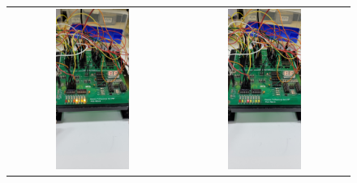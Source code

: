 \documentclass[a4,12pt]{horizon-theme}
\begin{document}
\begin{figure}[!ht]
  \centering
  \begin{tabular}{cc}
    \includegraphics[width=0.45\textwidth, trim={0 50cm 0 15cm}, clip]{circ_1.jpg} & \includegraphics[width=0.45\textwidth, trim={0 50cm 0 15cm}, clip]{circ_2.jpg} \\

\end{tabular}
\end{figure}
\end{document}
